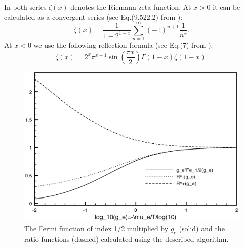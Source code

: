 In both series $\zeta(x)$ denotes the Riemann zeta-function.
At $x > 0$ it can be calculated as a convergent series (see Eq.(9.522.2) from \cite{gradshtein}): %
\begin{equation}
\zeta(x) = \frac{1}{1-2^{1-x}} \sum_{n=1}^\infty{(-1)^{n+1} \frac{1}{n^x}}.
\end{equation}
At $x < 0$ we use the following reflection formula (see Eq.(7) from \cite{mcleod}): %
\begin{equation}
\zeta(x) = 2^x \pi^{x-1} \sin(\frac{\pi x}{2}) \Gamma(1-x) \zeta(1-x).
\end{equation}

\begin{figure}[ht]
\centering
\includegraphics[scale=0.6]{FermiFunction.eps}
\caption{The Fermi function of index 1/2 multiplied by $g_e$ (solid) and the ratio functions (dashed) calculated using the described algorithm.}
\end{figure}


